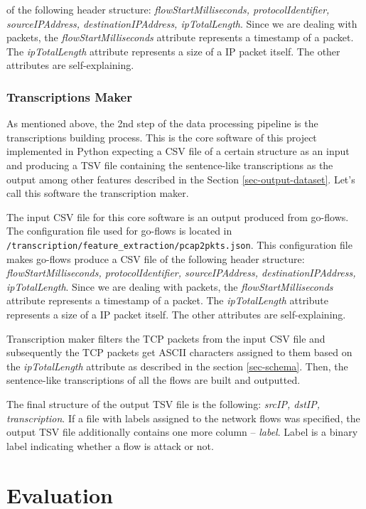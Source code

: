 \documentclass{article}
\begin{document}
of the following header structure: \textit{flowStartMilliseconds, protocolIdentifier, sourceIPAddress, destinationIPAddress, ipTotalLength}. Since we are dealing with packets, the \textit{flowStartMilliseconds} attribute represents a timestamp of a packet. The \textit{ipTotalLength} attribute represents a size of a IP packet itself. The other attributes are self-explaining.


\subsubsection{Transcriptions Maker}
As mentioned above, the 2nd step of the data processing pipeline is the transcriptions building process. This is the core software of this project implemented in Python expecting a CSV file of a certain structure as an input and producing a TSV file containing the sentence-like transcriptions as the output among other features described in the Section \ref{sec-output-dataset}. Let's call this software the transcription maker.

The input CSV file for this core software is an output produced from go-flows. The configuration file used for go-flows is located in \verb|/transcription/feature_extraction/pcap2pkts.json|. This configuration file makes go-flows produce a CSV file of the following header structure: \textit{flowStartMilliseconds, protocolIdentifier, sourceIPAddress, destinationIPAddress, ipTotalLength}. Since we are dealing with packets, the \textit{flowStartMilliseconds} attribute represents a timestamp of a packet. The \textit{ipTotalLength} attribute represents a size of a IP packet itself. The other attributes are self-explaining.

Transcription maker filters the TCP packets from the input CSV file and subsequently the TCP packets get ASCII characters assigned to them based on the \textit{ipTotalLength} attribute as described in the section \ref{sec-schema}. Then, the sentence-like transcriptions of all the flows are built and outputted.

The final structure of the output TSV file is the following: \textit{srcIP, dstIP, transcription}. If a file with labels assigned to the network flows was specified, the output TSV file additionally contains one more column -- \textit{label}. Label is a binary label indicating whether a flow is attack or not.


\section{Evaluation}
\end{document}
